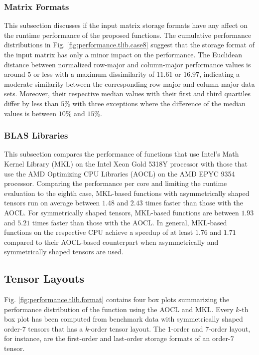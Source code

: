 \subsubsection{Matrix Formats}
This subsection discusses if the input matrix storage formats have any affect on the runtime performance of the proposed functions.
The cumulative performance distributions in Fig. \ref{fig:performance.tlib.case8} suggest that the storage format of the input matrix has only a minor impact on the performance.
The Euclidean distance between normalized row-major and column-major performance values is around $5$ or less with a maximum dissimilarity of $11.61$ or $16.97$, indicating a moderate similarity between the corresponding row-major and column-major data sets.
Moreover, their respective median values with their first and third quartiles differ by less than $5$\% with three exceptions where the difference of the median values is between $10$\% and $15$\%.


\subsubsection{BLAS Libraries}
This subsection compares the performance of functions that use Intel's Math Kernel Library (MKL) on the Intel Xeon Gold 5318Y processor with those that use the AMD Optimizing CPU Libraries (AOCL) on the AMD EPYC 9354 processor. 
Comparing the performance per core and limiting the runtime evaluation to the eighth case, MKL-based functions with asymmetrically shaped tensors run on average between $1.48$ and $2.43$ times faster than those with the AOCL.
For symmetrically shaped tensors, MKL-based functions are between $1.93$ and $5.21$ times faster than those with the AOCL.
In general, MKL-based functions on the respective CPU achieve a speedup of at least $1.76$ and $1.71$ compared to their AOCL-based counterpart when asymmetrically and symmetrically shaped tensors are used.



\subsection{Tensor Layouts}
Fig. \ref{fig:performance.tlib.format} contains four box plots summarizing the performance distribution of the  function using the AOCL and MKL.
Every $k$-th box plot has been computed from benchmark data with symmetrically shaped order-$7$ tensors that has a $k$-order tensor layout.
The $1$-order and $7$-order layout, for instance, are the first-order and last-order storage formats of an order-$7$ tensor.

